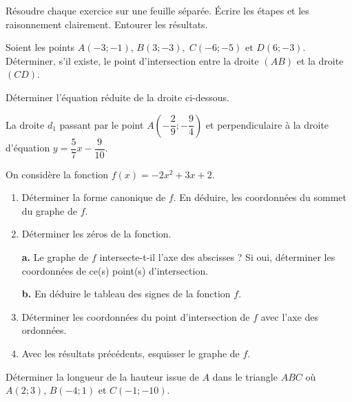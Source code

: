 \documentclass[a4paper,12pt]{report}
\begin{document}
Résoudre chaque exercice sur une feuille séparée. Écrire les étapes et les raisonnement clairement. Entourer les résultats. 


\begin{exo}
	 Soient les points $A(-3;-1),\,B(3;-3), \;C(-6;-5)$ et $D(6;-3)$. Déterminer, s'il existe, le point d'intersection entre la droite $(AB)$ et la droite $(CD)$.
\end{exo}

\begin{exo}
Déterminer l'équation réduite de la droite ci-dessous.

 La droite $d_{1}$ passant par le point $A\left(-\dfrac{2}{9};-\dfrac{9}{4}\right)$ et perpendiculaire à la droite d'équation $y=\dfrac{5}{7}x-\dfrac{9}{10}$.

\end{exo}
\begin{exo}
On considère la fonction $f(x)=-2x^2+3x+2$.

\begin{enumerate}[itemsep=1em, label=\arabic*)]
	\item Déterminer la forme canonique de $f$. En déduire, les coordonnées du sommet du graphe de $f$.
	\item Déterminer les zéros de la fonction.

\medskip
\textbf {a.}  Le graphe de $f$ intersecte-t-il l'axe des abscisses ? Si oui, déterminer les coordonnées de ce(s) point(s) d'intersection.

\medskip
\textbf {b.}  En déduire le tableau des signes de la fonction $f$.
	\item Déterminer les coordonnées du point d'intersection de $f$ avec l'axe des ordonnées.
	\item Avec les résultats précédents, esquisser le graphe de $f$.
\end{enumerate}
\end{exo}
\begin{exo}
Déterminer la longueur de la hauteur issue de $A$ dans le triangle $ABC$ où $A(2;3)$, $B(-4;1)$ et $C(-1;-10)$. 
\end{exo}
\end{document}
